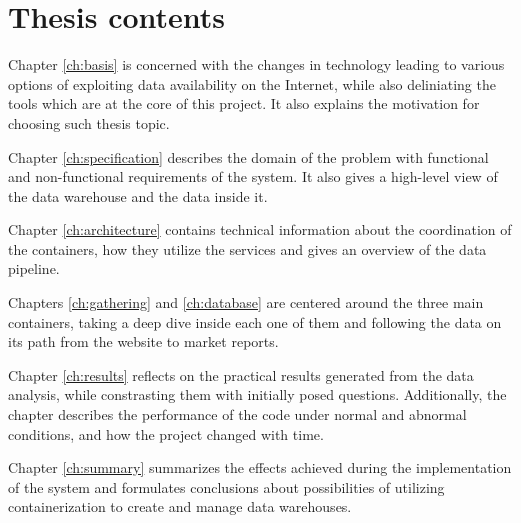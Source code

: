 \section{Thesis contents}
Chapter \ref{ch:basis} is concerned with the changes in technology leading to various options of exploiting data availability on the Internet, while also deliniating the tools which are at the core of this project. It also explains the motivation for choosing such thesis topic. \par
Chapter \ref{ch:specification} describes the domain of the problem with functional and non-functional requirements of the system. It also gives a high-level view of the data warehouse and the data inside it. \par
Chapter \ref{ch:architecture} contains technical information about the coordination of the containers, how they utilize the services and gives an overview of the data pipeline. \par
Chapters \ref{ch:gathering} and \ref{ch:database} are centered around the three main containers, taking a deep dive inside each one of them and following the data on its path from the website to market reports. \par
Chapter \ref{ch:results} reflects on the practical results generated from the data analysis, while constrasting them with initially posed questions. Additionally, the chapter describes the performance of the code under normal and abnormal conditions, and how the project changed with time. \par
Chapter \ref{ch:summary} summarizes the effects achieved during the implementation of the system and formulates conclusions about possibilities of utilizing containerization to create and manage data warehouses.